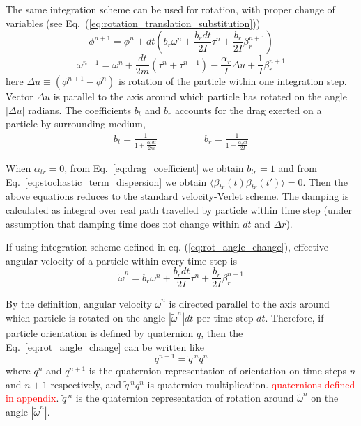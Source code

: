 The same integration scheme can be used for rotation, with proper change of variables (see Eq.~(\ref{eq:rotation_translation_substitution}))
\begin{equation}
\label{eq:rot_angle_change}
	\phi^{n+1} = \phi^n + dt \left(
	  b_{r} \omega^n
	  + \frac{b_{r} dt}{2I}\tau^n
	  + \frac{b_{r} }{2I}\beta_{r}^{n+1}
	 \right)
\end{equation}
\begin{equation}
\label{eq:rot_ang_velocity_change}
	\omega^{n+1} = \omega^n
	+ \frac{dt}{2m}\left(\tau^n + \tau^{n+1}\right)
	- \frac{\alpha_{r}}{I}\Delta u
	+ \frac{1}{I}\beta_{r}^{n+1}
\end{equation}
here $\Delta u \equiv \left(\phi^{n+1} - \phi^n\right)$ is rotation of the particle within one integration step. Vector $\Delta u$ is parallel to the axis around which particle has rotated on the angle $|\Delta u|$ radians. The coefficients $b_t$ and $b_r$ accounts for the drag exerted on a particle by surrounding medium,
\begin{equation}
\label{eq:drag_coefficient}
	\begin{aligned}
		b_t = \frac{1}{1 + \frac{\alpha_t dt}{2 m}}
	\end{aligned}
	\qquad
	\qquad
	\begin{aligned}
		b_r = \frac{1}{1 + \frac{\alpha_r dt}{2 I}}
	\end{aligned}
\end{equation}

When $\alpha_{tr} = 0$, from Eq.~\eqref{eq:drag_coefficient} we obtain $b_{tr} = 1$ and from Eq.~\eqref{eq:stochastic_term_dispersion} we obtain $\langle\beta_{tr}(t)\beta_{tr}(t')\rangle = 0$. Then the above equations reduces to the standard velocity-Verlet scheme. The damping is calculated as integral  over real path travelled by particle within time step (under assumption that damping time does not change within $dt$ and $\Delta r$).

If using integration scheme defined in eq. (\ref{eq:rot_angle_change}), effective angular velocity of a particle within every time step is
\begin{equation}
\label{eq:effective_angular_velocity}
	\tilde{\omega}^n = b_{r} \omega^n
	+ \frac{b_{r} dt}{2I}\tau^n
	+ \frac{b_{r} }{2I}\beta_{r}^{n+1}
\end{equation}

By the definition, angular velocity $\tilde{\omega}^n$ is directed parallel to the axis around which particle is rotated on the angle $|\tilde{\omega}^n|dt$ per time step $dt$. Therefore, if particle orientation is defined by quaternion $q$, then the Eq.~\eqref{eq:rot_angle_change} can be written like
\begin{equation}
q^{n+1} = \tilde{q}\,^n q^{n}
\end{equation}
where $q^n$ and $q^{n+1}$ is the quaternion representation of orientation on time steps $n$ and $n+1$ respectively, and $\tilde{q}\,^n q^{n}$ is quaternion multiplication. \textcolor{red}{quaternions defined in appendix}. $\tilde{q}\,^n$ is the quaternion representation of rotation around $\tilde{\omega}^n$ on the angle $|\tilde{\omega}^n|$.

